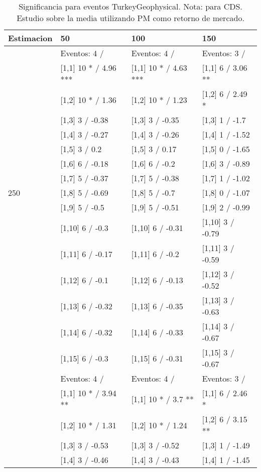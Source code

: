 \begin{table}

\caption{Significancia para eventos TurkeyGeophysical. Nota: para CDS. Estudio sobre la media utilizando PM como retorno de mercado.}
\centering
\begin{tabular}[t]{llll}
\toprule
Estimacion & 50 & 100 & 150\\
\midrule
 & Eventos:  4 / & Eventos:  4 / & Eventos:  3 /\\
 & {}[1,1] 10 * / 4.96 *** & {}[1,1] 10 * / 4.63 *** & {}[1,1] 6  / 3.06 **\\
 & {}[1,2] 10 * / 1.36 & {}[1,2] 10 * / 1.23 & {}[1,2] 6  / 2.49 *\\
 & {}[1,3] 3  / -0.38 & {}[1,3] 3  / -0.35 & {}[1,3] 1  / -1.7\\
 & {}[1,4] 3  / -0.27 & {}[1,4] 3  / -0.26 & {}[1,4] 1  / -1.52\\
\addlinespace
 & {}[1,5] 3  / 0.2 & {}[1,5] 3  / 0.17 & {}[1,5] 0  / -1.65\\
 & {}[1,6] 6  / -0.18 & {}[1,6] 6  / -0.2 & {}[1,6] 3  / -0.89\\
 & {}[1,7] 5  / -0.37 & {}[1,7] 5  / -0.38 & {}[1,7] 1  / -1.02\\
250 & {}[1,8] 5  / -0.69 & {}[1,8] 5  / -0.7 & {}[1,8] 0  / -1.07\\
 & {}[1,9] 5  / -0.5 & {}[1,9] 5  / -0.51 & {}[1,9] 2  / -0.99\\
\addlinespace
 & {}[1,10] 6  / -0.3 & {}[1,10] 6  / -0.31 & {}[1,10] 3  / -0.79\\
 & {}[1,11] 6  / -0.17 & {}[1,11] 6  / -0.2 & {}[1,11] 3  / -0.59\\
 & {}[1,12] 6  / -0.1 & {}[1,12] 6  / -0.13 & {}[1,12] 3  / -0.52\\
 & {}[1,13] 6  / -0.32 & {}[1,13] 6  / -0.35 & {}[1,13] 3  / -0.63\\
 & {}[1,14] 6  / -0.32 & {}[1,14] 6  / -0.33 & {}[1,14] 3  / -0.67\\
\addlinespace
 & {}[1,15] 6  / -0.3 & {}[1,15] 6  / -0.31 & {}[1,15] 3  / -0.67\\
 & Eventos:  4 / & Eventos:  4 / & Eventos:  3 /\\
 & {}[1,1] 10 * / 3.94 ** & {}[1,1] 10 * / 3.7 ** & {}[1,1] 6  / 2.46 *\\
 & {}[1,2] 10 * / 1.31 & {}[1,2] 10 * / 1.24 & {}[1,2] 6  / 3.15 **\\
 & {}[1,3] 3  / -0.53 & {}[1,3] 3  / -0.52 & {}[1,3] 1  / -1.49\\
\addlinespace
 & {}[1,4] 3  / -0.46 & {}[1,4] 3  / -0.43 & {}[1,4] 1  / -1.45\\

\end{tabular}
\end{table}
